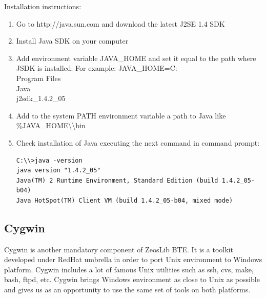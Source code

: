 \documentclass[a4paper,12pt,oneside]{book}
\begin{document}
Installation instructions:
\begin{enumerate}
  \item Go to http://java.sun.com and download the latest J2SE 1.4 SDK
	\item Install Java SDK on your computer
	\item
	  Add environment variable JAVA\_HOME and set it equal to the path where JSDK is installed.
		For example: JAVA\_HOME=C:\\Program Files\\Java\\j2sdk\_1.4.2\_05
	\item Add to the system PATH environment variable a path to Java like \%JAVA\_HOME\textbackslash\textbackslash bin
	\item Check installation of Java executing the next command in command prompt:
	  \begin{verbatim}
C:\\>java -version
java version "1.4.2_05"
Java(TM) 2 Runtime Environment, Standard Edition (build 1.4.2_05-b04)
Java HotSpot(TM) Client VM (build 1.4.2_05-b04, mixed mode)
    \end{verbatim}
\end{enumerate}

\subsection{Cygwin}
Cygwin is another mandatory component of ZeosLib BTE.
It is a toolkit developed under RedHat umbrella in order to port Unix environment to Windows platform.
Cygwin includes a lot of famous Unix utilities such as ssh, cvs, make, bash, ftpd, etc.
Cygwin brings Windows environment as close to Unix as possible and gives us as an opportunity to use the same set of tools on both platforms. 
\end{document}
